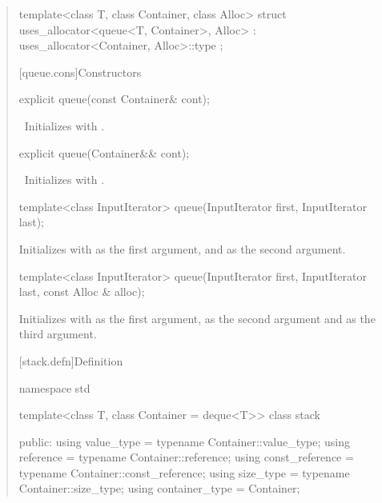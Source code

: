 \documentclass{wg21}
\begin{document}
\begin{quote}
\begin{codeblock}
{	template<class T, class Container, class Alloc>
	struct uses_allocator<queue<T, Container>, Alloc>
	: uses_allocator<Container, Alloc>::type { };
}
\end{codeblock}

[queue.cons]{Constructors}

\begin{itemdecl}
	explicit queue(const Container& cont);
\end{itemdecl}

\begin{itemdescr}
	\pnum
	\effects\ Initializes  with .
\end{itemdescr}

\begin{itemdecl}
	explicit queue(Container&& cont);
\end{itemdecl}

\begin{itemdescr}
	\pnum
	\effects\ Initializes  with .
\end{itemdescr}

\begin{addedblock}

\begin{itemdecl}
template<class InputIterator>
queue(InputIterator first, InputIterator last);
\end{itemdecl}

\begin{itemdescr}
\pnum
\effects
Initializes  with  as the first argument, and  as the second argument.
\end{itemdescr}

\begin{itemdecl}
template<class InputIterator>
queue(InputIterator first, InputIterator last, const Alloc & alloc);
\end{itemdecl}

\begin{itemdescr}
\pnum
\effects
Initializes  with  as the first argument,  as the second argument and  as the third argument.
\end{itemdescr}


\end{addedblock}

[stack.defn]{Definition}

\begin{codeblock}
namespace std {
	template<class T, class Container = deque<T>>
	class stack {
		public:
		using value_type      = typename Container::value_type;
		using reference       = typename Container::reference;
		using const_reference = typename Container::const_reference;
		using size_type       = typename Container::size_type;
		using container_type  = Container;
		
}}
\end{codeblock}
\end{quote}
\end{document}
